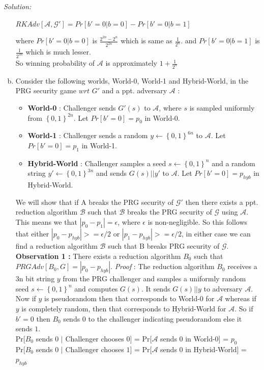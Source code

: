 \documentclass[a4paper, 11pt]{article}
\newenvironment{solution}
    {\textit{Solution:}}
    {\clearpage}
\newcommand{\bit}{\left\{0, 1\right\}}
\newcommand{\calA}{\mathcal{A}}
\newcommand{\calB}{\mathcal{B}}
\newcommand{\calG}{\mathcal{G}}
\begin{document}
\begin{solution}
\begin{enumerate}[(a)]
        \begin{center}
            $RKAdv[\calA, \calG'] = Pr[b'=0|b=0] - Pr[b'=0|b=1]$
        \end{center}
        where $Pr[b'=0|b=0]$ is $ \frac{2^{2n} - 2^n}{2^{2n}} $ which is same as $\frac{1}{2^n}$.
        and $Pr[b'=0|b=1]$ is $\frac{1}{2^{3n}}$ which is much lesser. \\
        So winning probability of $\calA$ is approximately $1+ \frac{1}{2^n}$

        \item Consider the following worlds, World-0, World-1 and Hybrid-World, in the PRG security game $wrt$ $G'$ and a ppt. adversary $\calA$ : 
        \begin{itemize}
            \item \textbf{World-0} : Challenger sends $G'(s)$ to $\calA$, where $s$ is sampled uniformly from $\bit^{2n}$. Let $Pr[b'=0] = p_0$ in World-0. 
            \item  \textbf{World-1} : Challenger sends a random $y 
        \gets \bit^{6n}$ to $\calA$. Let $Pr[b'=0] = p_1$ in World-1.
            \item \textbf{Hybrid-World} : Challenger samples a seed $s \gets \bit^n$ and a random string $y' \gets \bit^{3n}$ and sends $G(s)||y'$ to $\calA$. Let $Pr[b'=0] = p_{hyb}$ in Hybrid-World.
        \end{itemize}
        We will show that if A breaks the PRG security of $\calG'$ then there exists a ppt. reduction algorithm $\calB$ such that $\calB$ breaks the PRG security of $\calG$ using $\calA$. This means we that $|p_0 - p_1| = \epsilon$, where $\epsilon$ is non-negligible. So this follows that either $|p_0 - p_{hyb}| >= \epsilon/2 $ or $|p_1 - p_{hyb}| >= \epsilon/2 $, in either case we can find a reduction algorithm $\calB$ such that B breaks PRG security of $\calG$.\\ 

        \textbf{Observation 1 : } There exists a reduction algorithm $B_0$ such that $PRGAdv[B_0, G] = |p_0 - p_{hyb}|$. 
        \textit{Proof} : The reduction algorithm $B_0$ receives a 3n bit string $y$ from the PRG challenger and samples a uniformly random seed $s \gets \bit^n$ and computes $G(s)$. It sends $G(s)||y$ to adversary $\calA$. Now if $y$ is pseudorandom then that corresponds to World-0 for $\calA$ whereas if $y$ is completely random, then that corresponds to Hybrid-World for $\calA$. So if $b' =0$ then $B_0$ sends $0$ to the challenger indicating pseudorandom else it sends $1$. \\
        Pr[$B_0$ sends $0$ $\mid$ Challenger chooses $0$] = Pr[$\calA$ sends 0 in World-0] = $p_0$ \\
        Pr[$B_0$ sends $0$ $\mid$ Challenger chooses $1$] = Pr[$\calA$ sends 0 in Hybrid-World] = $p_{hyb}$ \\


\end{enumerate}
\end{solution}
\end{document}
